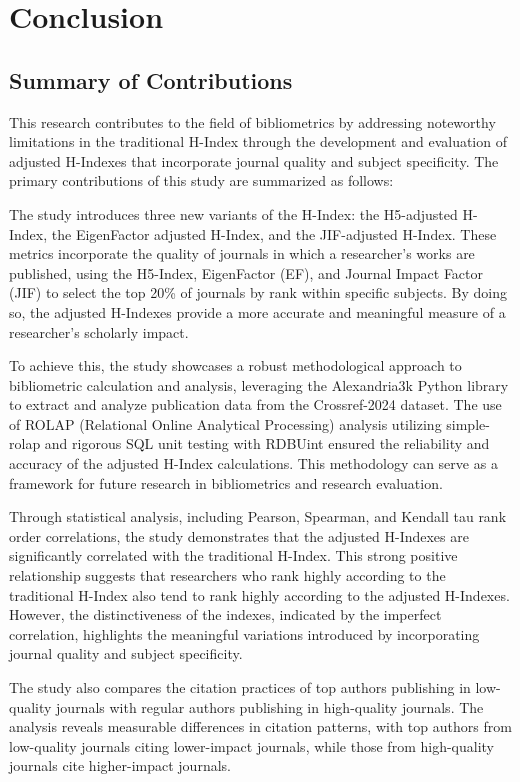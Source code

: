 \chapter{Conclusion}
\label{ch:conclusion}

\section{Summary of Contributions}

This research contributes to the field of bibliometrics by addressing
noteworthy limitations in the traditional H-Index through the development and
evaluation of adjusted H-Indexes that incorporate journal quality and subject
specificity. The primary contributions of this study are summarized as follows:

The study introduces three new variants of the H-Index: the H5-adjusted
H-Index, the EigenFactor adjusted H-Index, and the JIF-adjusted H-Index. These
metrics incorporate the quality of journals in which a researcher’s works are
published, using the H5-Index, EigenFactor (EF), and Journal Impact Factor (JIF) to
select the top 20\% of journals by rank within specific subjects. By doing so,
the adjusted H-Indexes provide a more accurate and meaningful measure of a
researcher’s scholarly impact.

To achieve this, the study showcases a robust methodological approach to
bibliometric calculation and analysis, leveraging the Alexandria3k Python library to 
extract and analyze publication data from the Crossref-2024 dataset. 
The use of ROLAP (Relational Online Analytical Processing) analysis 
utilizing simple-rolap and rigorous SQL unit testing with RDBUint ensured
the reliability and accuracy of the adjusted H-Index calculations. This
methodology can serve as a framework for future research in bibliometrics and
research evaluation.

Through statistical analysis, including Pearson, Spearman, and
Kendall tau rank order correlations, the study demonstrates that the adjusted
H-Indexes are significantly correlated with the traditional H-Index. This
strong positive relationship suggests that researchers who rank highly
according to the traditional H-Index also tend to rank highly according to the
adjusted H-Indexes. However, the distinctiveness of the indexes,
indicated by the imperfect correlation, highlights the meaningful variations
introduced by incorporating journal quality and subject specificity.

The study also compares the citation practices of top authors publishing in
low-quality journals with regular authors publishing in high-quality journals. The
analysis reveals measurable differences in citation patterns, with top authors
from low-quality journals citing lower-impact journals, while those from
high-quality journals cite higher-impact journals.

